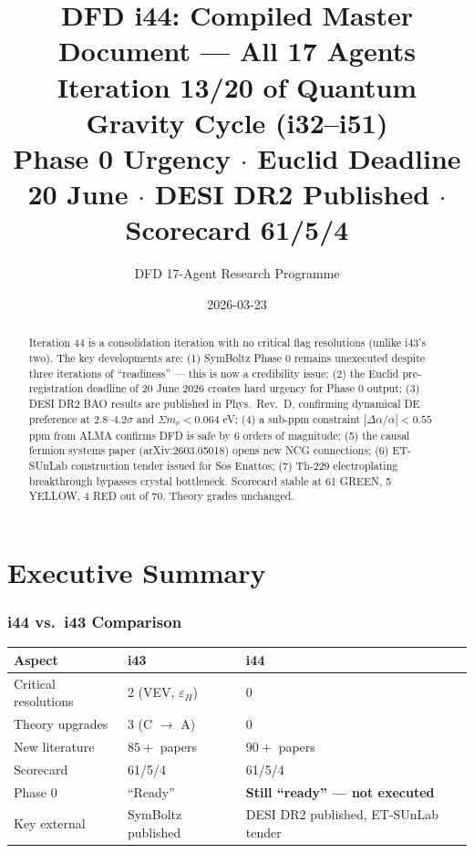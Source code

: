 \documentclass[11pt,a4paper]{article}
\title{DFD i44: Compiled Master Document --- All 17 Agents\\[6pt]
\large Iteration 13/20 of Quantum Gravity Cycle (i32--i51)\\[6pt]
\normalsize Phase 0 Urgency $\cdot$ Euclid Deadline 20 June $\cdot$ DESI DR2 Published $\cdot$ Scorecard 61/5/4}
\author{DFD 17-Agent Research Programme}
\date{2026-03-23}
\begin{document}
\maketitle

\begin{abstract}
Iteration 44 is a consolidation iteration with no critical flag resolutions (unlike i43's two). The key developments are: (1) SymBoltz Phase 0 remains unexecuted despite three iterations of ``readiness'' --- this is now a credibility issue; (2) the Euclid pre-registration deadline of 20 June 2026 creates hard urgency for Phase 0 output; (3) DESI DR2 BAO results are published in Phys.\ Rev.\ D, confirming dynamical DE preference at $2.8$--$4.2\sigma$ and $\Sigma m_\nu < 0.064$ eV; (4) a sub-ppm constraint $|\Delta\alpha/\alpha| < 0.55$ ppm from ALMA confirms DFD is safe by 6 orders of magnitude; (5) the causal fermion systems paper (arXiv:2603.05018) opens new NCG connections; (6) ET-SUnLab construction tender issued for Sos Enattos; (7) Th-229 electroplating breakthrough bypasses crystal bottleneck. Scorecard stable at 61 GREEN, 5 YELLOW, 4 RED out of 70. Theory grades unchanged.
\end{abstract}

\tableofcontents
\newpage

\part{Executive Summary}

\section{i44 vs.\ i43 Comparison}

\begin{center}
\begin{tabular}{lll}
\toprule
\textbf{Aspect} & \textbf{i43} & \textbf{i44} \\
\midrule
Critical resolutions & 2 (VEV, $\varepsilon_H$) & 0 \\
Theory upgrades & 3 (C $\to$ A) & 0 \\
New literature & $85+$ papers & $90+$ papers \\
Scorecard & 61/5/4 & 61/5/4 \\
Phase 0 & ``Ready'' & \textbf{Still ``ready'' --- not executed} \\
Key external & SymBoltz published & DESI DR2 published, ET-SUnLab tender \\
\bottomrule
\end{tabular}
\end{center}
\end{document}
